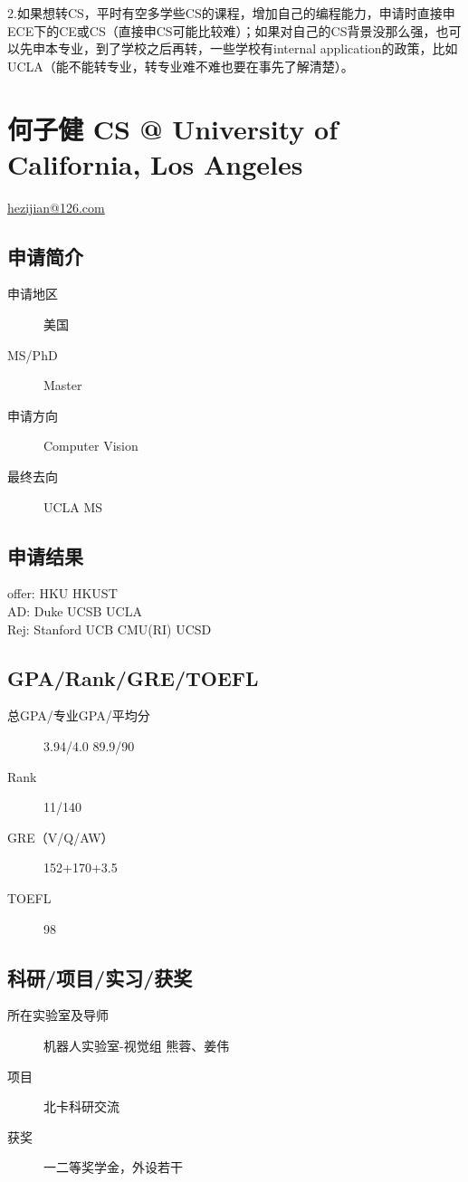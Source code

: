 \documentclass[11pt,fleqn,openany]{book} %
\begin{document}
2.如果想转CS，平时有空多学些CS的课程，增加自己的编程能力，申请时直接申ECE下的CE或CS（直接申CS可能比较难）；如果对自己的CS背景没那么强，也可以先申本专业，到了学校之后再转，一些学校有internal application的政策，比如UCLA（能不能转专业，转专业难不难也要在事先了解清楚）。
\clearpage
\section{何子健 CS @ University of California, Los Angeles}
\hfill \href{mailto:hezijian@126.com}{hezijian@126.com}

\noindent\begin{minipage}[t]{0.45\textwidth}
\subsection*{申请简介}
\begin{description}
\item[申请地区] 美国
\item[MS/PhD] Master
\item[申请方向] Computer Vision
\item[最终去向] UCLA MS
\end{description}
\end{minipage}
\hfill
\begin{minipage}[t]{0.45\textwidth}
\subsection*{申请结果}
\noindent offer: HKU HKUST\\
AD: Duke UCSB UCLA\\
Rej: Stanford UCB CMU(RI) UCSD
\end{minipage}
\subsection*{GPA/Rank/GRE/TOEFL}
\begin{description}
\item[总GPA/专业GPA/平均分] 3.94/4.0  89.9/90
\item[Rank] 11/140
\item[GRE（V/Q/AW）] 152+170+3.5
\item[TOEFL] 98
\end{description}

\subsection*{科研/项目/实习/获奖}
\begin{description}
\item[所在实验室及导师] 机器人实验室-视觉组 熊蓉、姜伟
\item[项目] 北卡科研交流
\item[获奖] 一二等奖学金，外设若干
\end{description}
\end{document}
